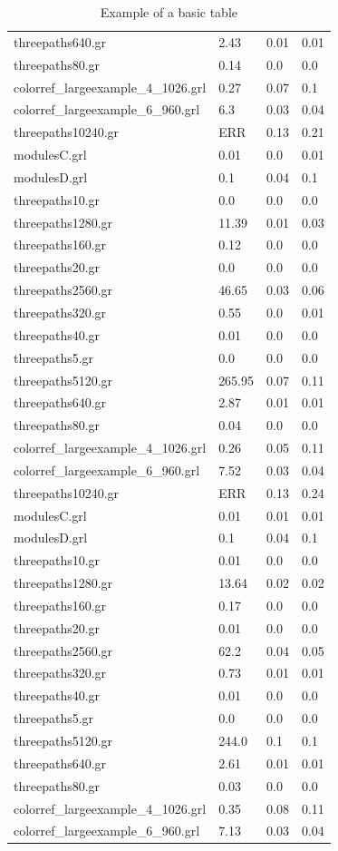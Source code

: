 \documentclass[11pt]{article}
\begin{document}
\begin{table}[h!]
\begin{tabularx}{\textwidth}{|l|X|X|X|}
		threepaths640.gr & 2.43 & 0.01 & 0.01 \\
		threepaths80.gr & 0.14 & 0.0 & 0.0 \\
		colorref\_largeexample\_4\_1026.grl & 0.27 & 0.07 & 0.1 \\
		colorref\_largeexample\_6\_960.grl & 6.3 & 0.03 & 0.04 \\
		threepaths10240.gr & ERR & 0.13 & 0.21 \\
		modulesC.grl & 0.01 & 0.0 & 0.01 \\
		modulesD.grl & 0.1 & 0.04 & 0.1 \\
		threepaths10.gr & 0.0 & 0.0 & 0.0 \\
		threepaths1280.gr & 11.39 & 0.01 & 0.03 \\
		threepaths160.gr & 0.12 & 0.0 & 0.0 \\
		threepaths20.gr & 0.0 & 0.0 & 0.0 \\
		threepaths2560.gr & 46.65 & 0.03 & 0.06 \\
		threepaths320.gr & 0.55 & 0.0 & 0.01 \\
		threepaths40.gr & 0.01 & 0.0 & 0.0 \\
		threepaths5.gr & 0.0 & 0.0 & 0.0 \\
		threepaths5120.gr & 265.95 & 0.07 & 0.11 \\
		threepaths640.gr & 2.87 & 0.01 & 0.01 \\
		threepaths80.gr & 0.04 & 0.0 & 0.0 \\
		colorref\_largeexample\_4\_1026.grl & 0.26 & 0.05 & 0.11 \\
		colorref\_largeexample\_6\_960.grl & 7.52 & 0.03 & 0.04 \\
		threepaths10240.gr & ERR & 0.13 & 0.24 \\
		modulesC.grl & 0.01 & 0.01 & 0.01 \\
		modulesD.grl & 0.1 & 0.04 & 0.1 \\
		threepaths10.gr & 0.01 & 0.0 & 0.0 \\
		threepaths1280.gr & 13.64 & 0.02 & 0.02 \\
		threepaths160.gr & 0.17 & 0.0 & 0.0 \\
		threepaths20.gr & 0.01 & 0.0 & 0.0 \\
		threepaths2560.gr & 62.2 & 0.04 & 0.05 \\
		threepaths320.gr & 0.73 & 0.01 & 0.01 \\
		threepaths40.gr & 0.01 & 0.0 & 0.0 \\
		threepaths5.gr & 0.0 & 0.0 & 0.0 \\
		threepaths5120.gr & 244.0 & 0.1 & 0.1 \\
		threepaths640.gr & 2.61 & 0.01 & 0.01 \\
		threepaths80.gr & 0.03 & 0.0 & 0.0 \\
		colorref\_largeexample\_4\_1026.grl & 0.35 & 0.08 & 0.11 \\
		colorref\_largeexample\_6\_960.grl & 7.13 & 0.03 & 0.04 \\
        \hline
    \end{tabularx}
    \caption{Example of a basic table}
    \label{tab:1}
\end{table}
\end{document}
